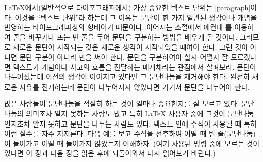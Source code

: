 \LaTeX 에서(일반적으로 타이포그래피에서) 가장 중요한 텍스트 단위는 [paragraph]이다.
이것을 ``텍스트 단위''라 하는데 그 이유는 문단이 한 가지 일관된 생각이나 개념을 반영하는 타이포그래피상의 형태이기 때문이다.
이어지는 소절에서 예컨대 \texttt{\bs\bs}를 이용하여 줄을 바꾸거나 또는 빈 줄을 두어 문단을 구분하는 방법을 
배우게 될 것이다. 그러므로 새로운 문단이 시작되는 것은 새로운 생각이 시작되었을 때여야 한다. 그런 것이 아니면 
문단 구분이 아니라 만을 써야 한다.%
문단을 구분하여야 할지 어떨지 잘 모르겠다면 
텍스트가 개념이나 사고의 흐름을 전달하는 매개체라는 관점에서 살펴보라. 
문단이 나누어졌는데 이전의 생각이 이어지고 있다면 그 문단나눔을 제거해야 한다. 
완전히 새로운 사유를 전개하는데 문단이 나누어지지 않았다면 거기서 문단을 나누어야 한다.

많은 사람들이 문단나눔을 적절히 하는 것이 얼마나 중요한지를 잘 모르고 있다. 문단나눔의 의미조차
알지 못하는 사람도 많고 특히 \LaTeX{} 사용자 중에 그것이 문단나눔인지조차 알지 못하고 문단을 나누는 사람도 있다.
텍스트 안에 수식이 사용될 때 특히 이런 실수를 자주 저지른다. 
다음 예를 보고 수식을 전후하여 어떨 때 빈 줄(문단나눔)이 들어가고 어떨 때 들어가지 않았는지 이해하자.
(여기 사용된 명령 중에 모르는 것이 있다면 이 장과 다음 장을 읽은 후에 되돌아와서 다시 읽어보기 바란다.)

